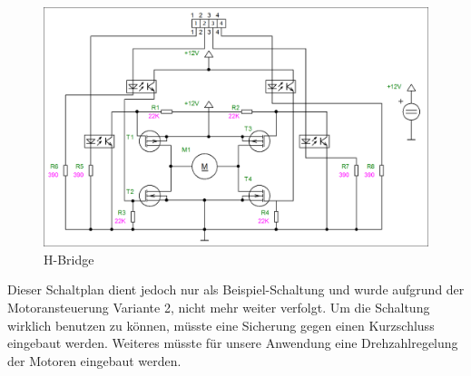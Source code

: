 \begin{figure}[H] 
\begin{center}

\includegraphics[width=15cm]{Bilder/Schaltplan/Schaltplan_HBridge}
\caption{H-Bridge}
\label{HBridge}

\end{center}
\end{figure}

Dieser Schaltplan dient jedoch nur als Beispiel-Schaltung und wurde aufgrund der Motoransteuerung Variante 2, nicht mehr weiter verfolgt. Um die Schaltung wirklich benutzen zu können, müsste eine Sicherung gegen einen Kurzschluss eingebaut werden. Weiteres müsste für unsere Anwendung eine Drehzahlregelung der Motoren eingebaut werden.
\newpage
